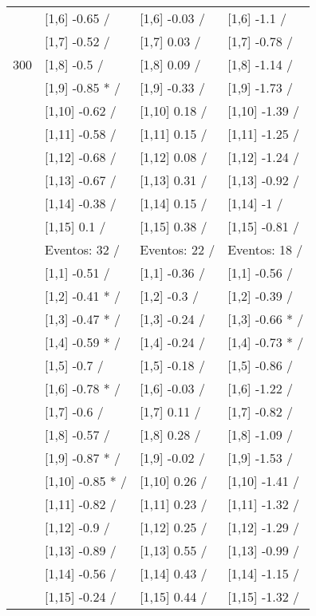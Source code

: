 \begin{table}
\begin{tabular}[t]{llll}
 & {}[1,6] -0.65  / & {}[1,6] -0.03  / & {}[1,6] -1.1  /\\
 & {}[1,7] -0.52  / & {}[1,7] 0.03  / & {}[1,7] -0.78  /\\
300 & {}[1,8] -0.5  / & {}[1,8] 0.09  / & {}[1,8] -1.14  /\\
\addlinespace
 & {}[1,9] -0.85 * / & {}[1,9] -0.33  / & {}[1,9] -1.73  /\\
 & {}[1,10] -0.62  / & {}[1,10] 0.18  / & {}[1,10] -1.39  /\\
 & {}[1,11] -0.58  / & {}[1,11] 0.15  / & {}[1,11] -1.25  /\\
 & {}[1,12] -0.68  / & {}[1,12] 0.08  / & {}[1,12] -1.24  /\\
 & {}[1,13] -0.67  / & {}[1,13] 0.31  / & {}[1,13] -0.92  /\\
\addlinespace
 & {}[1,14] -0.38  / & {}[1,14] 0.15  / & {}[1,14] -1  /\\
 & {}[1,15] 0.1  / & {}[1,15] 0.38  / & {}[1,15] -0.81  /\\
 & Eventos:  32 / & Eventos:  22 / & Eventos:  18 /\\
 & {}[1,1] -0.51  / & {}[1,1] -0.36  / & {}[1,1] -0.56  /\\
 & {}[1,2] -0.41 * / & {}[1,2] -0.3  / & {}[1,2] -0.39  /\\
\addlinespace
 & {}[1,3] -0.47 * / & {}[1,3] -0.24  / & {}[1,3] -0.66 * /\\
 & {}[1,4] -0.59 * / & {}[1,4] -0.24  / & {}[1,4] -0.73 * /\\
 & {}[1,5] -0.7  / & {}[1,5] -0.18  / & {}[1,5] -0.86  /\\
 & {}[1,6] -0.78 * / & {}[1,6] -0.03  / & {}[1,6] -1.22  /\\
 & {}[1,7] -0.6  / & {}[1,7] 0.11  / & {}[1,7] -0.82  /\\
\addlinespace
500 & {}[1,8] -0.57  / & {}[1,8] 0.28  / & {}[1,8] -1.09  /\\
 & {}[1,9] -0.87 * / & {}[1,9] -0.02  / & {}[1,9] -1.53  /\\
 & {}[1,10] -0.85 * / & {}[1,10] 0.26  / & {}[1,10] -1.41  /\\
 & {}[1,11] -0.82  / & {}[1,11] 0.23  / & {}[1,11] -1.32  /\\
 & {}[1,12] -0.9  / & {}[1,12] 0.25  / & {}[1,12] -1.29  /\\
\addlinespace
 & {}[1,13] -0.89  / & {}[1,13] 0.55  / & {}[1,13] -0.99  /\\
 & {}[1,14] -0.56  / & {}[1,14] 0.43  / & {}[1,14] -1.15  /\\
 & {}[1,15] -0.24  / & {}[1,15] 0.44  / & {}[1,15] -1.32  /\\
\bottomrule
\end{tabular}
\end{table}
